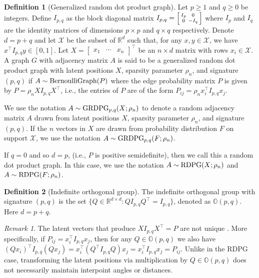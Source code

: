 \documentclass[
  11pt,
]{article}
\theoremstyle{definition}
\newtheorem{definition}{Definition}[section]
\theoremstyle{definition}
\theoremstyle{definition}
\theoremstyle{definition}
\theoremstyle{remark}
\newtheorem*{remark}{Remark}
\begin{document}
\begin{definition}[Generalized random dot product graph]
\label{def:grdpg}
Let $p \geq 1$ and $q \geq 0$ be integers. 
Define $I_{p,q}$ as the block diagonal matrix $I_{p,q} = \Bigl[\begin{smallmatrix} I_{p} & 0 \\ 0 & - I_{q} \end{smallmatrix} \Bigr]$ where $I_p$ and $I_q$ are the identity matrices of dimensions $p \times p$ and $q \times q$ respectively. 
Denote $d = p + q$ and let $\mathcal{X}$ be the subset of $\mathbb{R}^d$ such that, for any $x, y \in \mathcal{X}$, we have $x^\top I_{p,q} y \in [0, 1]$. 
Let $X = \begin{bmatrix} x_1 & \cdots & x_n \end{bmatrix}^\top$ be an $n \times d$ matrix with rows $x_i \in \mathcal{X}$. 
A graph $G$ with adjacency matrix $A$ is said to be a generalized random dot product graph with latent positions $X$, sparsity parameter $\rho_n$, and signature $(p, q)$ if $A \sim \mathrm{BernoulliGraph}(P)$ where the edge probability matrix $P$ is given by $P = \rho_n X I_{p,q} X^\top$, i.e., the entries of $P$ are of the form $P_{ij} = \rho_n x_i^\top I_{p,q} x_j$. 

We use the notation $A \sim \mathrm{GRDPG}_{p,q}(X; \rho_n)$ to denote a random adjacency matrix $A$ drawn from latent positions $X$, sparsity parameter $\rho_n$, and signature $(p, q)$. If the $n$ vectors in $X$ are drawn from probability distribution $F$ on support $\mathcal{X}$, we use the notation $A \sim \mathrm{GRDPG}_{p,q}(F; \rho_n)$. 

If $q = 0$ and so $d = p$, (i.e., $P$ is positive semidefinite), then we call this a random dot product graph. 
In this case, we use the notation $A \sim \mathrm{RDPG}(X; \rho_n)$ and $A \sim \mathrm{RDPG}(F; \rho_n)$. 
\end{definition}

\begin{definition}[Indefinite orthogonal group]
\label{def:indefinite}
The indefinite orthogonal group with signature $(p, q)$ is
the set $\{Q \in \mathbb{R}^{d \times d} \colon Q I_{p, q} Q^{\top} = I_{p, q}\}$,
denoted as $\mathbb{O}(p, q)$. Here $d = p + q$. 
\end{definition}

\begin{remark}
\label{rem:non_identifiable}
The latent vectors that produce $X I_{p,q} X^\top = P$ are not unique
\citep{rubindelanchy2017statistical}.
More specifically, if $P_{ij} = x_i^\top I_{p, q} x_j$, then for any $Q \in \mathbb{O}(p, q)$ we also have 
$(Q x_i)^\top I_{p, q} (Q x_j) = x_i^\top (Q^\top I_{p, q} Q) x_j = x_i^\top I_{p, q} x_j = P_{ij}$. 
Unlike in the RDPG case, transforming the latent positions via multiplication by $Q \in \mathbb{O}(p, q)$ does not necessarily maintain interpoint angles or distances.
\end{remark}
\end{document}
